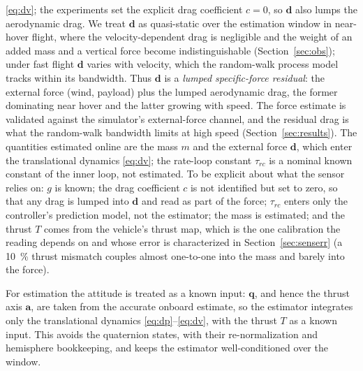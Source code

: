\documentclass{ieeeaccess}
\newcommand{\vect}[1]{\bm{#1}}
\begin{document}
\eqref{eq:dv}; the experiments set the explicit drag coefficient $c=0$, so $\vect{d}$
also lumps the aerodynamic drag. We treat $\vect{d}$ as quasi-static over the
estimation window in near-hover flight, where the velocity-dependent drag is
negligible and the weight of an added mass and a vertical force become indistinguishable
(Section~\ref{sec:obs}); under fast flight $\vect{d}$ varies with velocity, which
the random-walk process model tracks within its bandwidth. Thus $\vect{d}$ is a
\emph{lumped specific-force residual}: the external force (wind, payload) plus the
lumped aerodynamic drag, the former dominating near hover and the latter growing
with speed. The force estimate is validated against the simulator's external-force
channel, and the residual drag is what the random-walk bandwidth limits at high
speed (Section~\ref{sec:results}). The quantities
estimated online are the mass $m$ and the external force $\vect{d}$, which enter
the translational dynamics \eqref{eq:dv}; the rate-loop constant $\tau_{rc}$ is a
nominal known constant of the inner loop, not estimated. To be explicit about
what the sensor relies on: $g$ is known; the drag coefficient $c$ is not
identified but set to zero, so that any drag is lumped into $\vect{d}$ and read as
part of the force; $\tau_{rc}$ enters only the controller's prediction model, not
the estimator; the mass is estimated; and the thrust $T$ comes from the
vehicle's thrust map, which is the one calibration the reading depends on and
whose error is characterized in Section~\ref{sec:senserr} (a \SI{10}{\percent}
thrust mismatch couples almost one-to-one into the mass and barely into the
force).

For estimation the attitude is treated as a known input: $\vect{q}$, and hence
the thrust axis $\vect{a}$, are taken from the accurate onboard estimate, so the
estimator integrates only the translational dynamics
\eqref{eq:dp}--\eqref{eq:dv}, with the thrust $T$ as a known input. This avoids the
quaternion states, with their re-normalization and hemisphere bookkeeping, and
keeps the estimator well-conditioned over the window.
\end{document}
